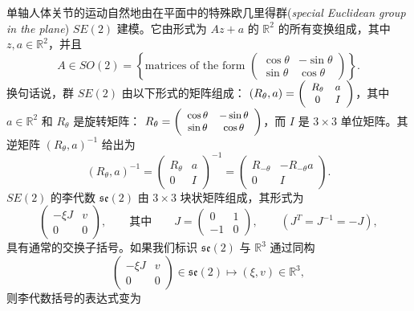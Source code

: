 \documentclass[11pt,fontset=founder]{ctexart}
\begin{document}
单轴人体关节的运动自然地由在平面中的特殊欧几里得群(\emph{special Euclidean group in the plane}) $SE(2)$ 建模。它由形式为 $Az+a$ 的 $\mathbb{R}^{2}$ 的所有变换组成，其中 $z,a\in \mathbb{R}^{2}$，并且%
\begin{equation*}
A\in SO(2)=\left\{ \text{matrices of the form }\left(
\begin{array}{cc}
\cos \theta & -\sin \theta \\
\sin \theta & \cos \theta%
\end{array}%
\right) \right\} .
\end{equation*}%
换句话说，群 $SE(2)$ 由以下形式的矩阵组成：\newline
$(R_{\theta },a) ={\small \left(
\begin{array}{cc}
R_{\theta } & a \\
0 & I%
\end{array}%
\right)}$，其中 $a\in \mathbb{R}^{2}$ 和 $R_{\theta }$ 是旋转矩阵：\newline
$R_{\theta }={\small \left(
\begin{array}{cc}
\cos \theta & -\sin \theta \\
\sin \theta & \cos \theta%
\end{array}%
\right)}$，而 $I$ 是 $3\times 3$ 单位矩阵。其逆矩阵 $%
\left( R_{\theta },a\right) ^{-1}$ 给出为%
\begin{equation*}
\left( R_{\theta },a\right) ^{-1}=\left(
\begin{array}{cc}
R_{\theta } & a \\
0 & I%
\end{array}%
\right) ^{-1}=\left(
\begin{array}{cc}
R_{-\theta } & -R_{-\theta }a \\
0 & I%
\end{array}%
\right) .
\end{equation*}%
$SE(2)$ 的李代数 $\mathfrak{se}(2)$ 由 $3\times 3$ 块状矩阵组成，其形式为%
\begin{equation*}
\left(
\begin{array}{cc}
-\xi J & v \\
0 & 0%
\end{array}%
\right) ,\qquad \text{其中}\qquad J=\left(
\begin{array}{cc}
0 & 1 \\
-1 & 0%
\end{array}%
\right), \qquad (J^{T}=J^{-1}=-J),
\end{equation*}%
具有通常的交换子括号。如果我们标识 $\mathfrak{se}(2)$ 与 $%
\mathbb{R}^{3}$ 通过同构%
\begin{equation*}
\left(
\begin{array}{cc}
-\xi J & v \\
0 & 0%
\end{array}%
\right) \in \mathfrak{se}(2)\longmapsto (\xi ,v)\in \mathbb{R}^{3},
\end{equation*}%
则李代数括号的表达式变为
\end{document}
